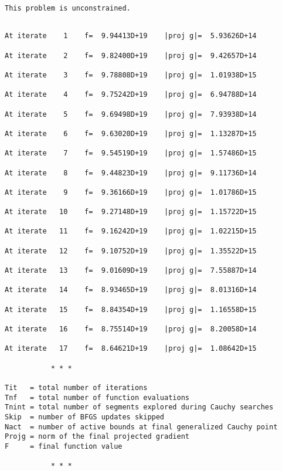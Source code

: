 \documentclass[11pt]{article}
\begin{document}
    \begin{Verbatim}[commandchars=\\\{\}]
 This problem is unconstrained.
    \end{Verbatim}

    \begin{Verbatim}[commandchars=\\\{\}]

At iterate    1    f=  9.94413D+19    |proj g|=  5.93626D+14

At iterate    2    f=  9.82400D+19    |proj g|=  9.42657D+14

At iterate    3    f=  9.78808D+19    |proj g|=  1.01938D+15

At iterate    4    f=  9.75242D+19    |proj g|=  6.94788D+14

At iterate    5    f=  9.69498D+19    |proj g|=  7.93938D+14

At iterate    6    f=  9.63020D+19    |proj g|=  1.13287D+15

At iterate    7    f=  9.54519D+19    |proj g|=  1.57486D+15

At iterate    8    f=  9.44823D+19    |proj g|=  9.11736D+14

At iterate    9    f=  9.36166D+19    |proj g|=  1.01786D+15

At iterate   10    f=  9.27148D+19    |proj g|=  1.15722D+15

At iterate   11    f=  9.16242D+19    |proj g|=  1.02215D+15

At iterate   12    f=  9.10752D+19    |proj g|=  1.35522D+15

At iterate   13    f=  9.01609D+19    |proj g|=  7.55887D+14

At iterate   14    f=  8.93465D+19    |proj g|=  8.01316D+14

At iterate   15    f=  8.84354D+19    |proj g|=  1.16558D+15

At iterate   16    f=  8.75514D+19    |proj g|=  8.20058D+14

At iterate   17    f=  8.64621D+19    |proj g|=  1.08642D+15

           * * *

Tit   = total number of iterations
Tnf   = total number of function evaluations
Tnint = total number of segments explored during Cauchy searches
Skip  = number of BFGS updates skipped
Nact  = number of active bounds at final generalized Cauchy point
Projg = norm of the final projected gradient
F     = final function value

           * * *


\end{Verbatim}
\end{document}
